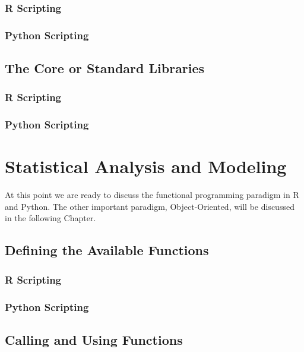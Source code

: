 \documentclass[]{book}
\theoremstyle{definition}
\theoremstyle{definition}
\theoremstyle{definition}
\theoremstyle{remark}
\begin{document}
\subsection{R Scripting}\label{r-scripting-8}

\subsection{Python Scripting}\label{python-scripting-8}

\section{The Core or Standard
Libraries}\label{the-core-or-standard-libraries-1}

\subsection{R Scripting}\label{r-scripting-9}

\subsection{Python Scripting}\label{python-scripting-9}

\chapter{Statistical Analysis and
Modeling}\label{statistical-analysis-and-modeling}

At this point we are ready to discuss the functional programming
paradigm in R and Python. The other important paradigm, Object-Oriented,
will be discussed in the following Chapter.

\section{Defining the Available
Functions}\label{defining-the-available-functions}

\subsection{R Scripting}\label{r-scripting-10}

\subsection{Python Scripting}\label{python-scripting-10}

\section{Calling and Using
Functions}\label{calling-and-using-functions-2}
\end{document}
